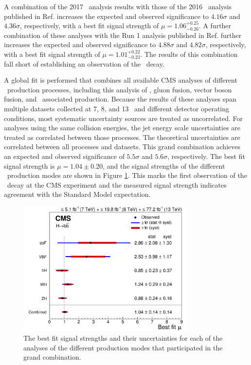A combination of the 2017 \VHbb\ analysis results with those of the 2016 \VHbb\ analysis published in Ref. \cite{CMSVHbbEvidence} increases the expected and observed significance to $4.16\sigma$ and $4.36\sigma$, respectively, with a best fit signal strength of $\mu = 1.06_{-0.26}^{+0.25}$. A further combination of these analyses with the Run 1 analysis published in Ref. \cite{CMSVHbbRun1} further increases the expected and observed significance to $4.88\sigma$ and $4.82\sigma$, respectively, with a best fit signal strength of $\mu = 1.01_{-0.23}^{+0.22}$. The results of this combination fall short of establishing an observation of the \VHbb\ decay.

A global fit is performed that combines all available CMS analyses of different \Htobb\ production processes, including this analysis of \VHbb, gluon fusion\cite{ggHbb}, vector boson fusion\cite{VBF}, and \qrkt\qrktbar\ associated production\cite{CMSttH1,CMSttH2,CMSttH3}. Because the results of these analyses span multiple datasets collected at 7, 8, and 13 \TeV\ and different detector operating conditions, most systematic uncertainty sources are treated as uncorrelated. For analyses using the same collision energies, the jet energy scale uncertainties are treated as correlated between those processes. The theoretical uncertainties are correlated between all processes and datasets. This grand combination achieves an expected and observed significance of $5.5\sigma$ and $5.6\sigma$, respectively. The best fit signal strength is $\mu = 1.04 \pm 0.20$, and the signal strengths of the different \Htobb\ production modes are shown in Figure \ref{fig:MuHbb}. This marks the first observation of the \Htobb\ decay at the CMS experiment and the measured signal strength indicates agreement with the Standard Model expectation.

\begin{figure}[htbp]
  \centering
    \includegraphics[width=3.5in]{images/CMS-HIG-18-016_Figure_003}
    \caption[\Hbb\ Combination Signal Strengths]{The best fit signal strengths and their uncertainties for each of the analyses of the different \Htobb production modes that participated in the grand combination.}
    \label{fig:MuHbb}
\end{figure}

